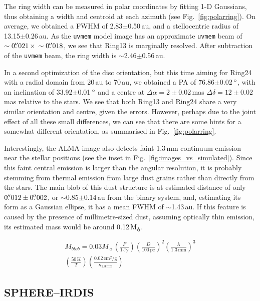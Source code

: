 \documentclass[fleqn,usenatbib,useAMS]{mnras}
\begin{document}
The ring width can be measured in polar coordinates by fitting 1-D Gaussians, thus obtaining a width and centroid at each azimuth (see Fig.~\ref{fig:polarring}). On average, we obtained a FWHM of 2.83$\pm$0.50\,au, and a stellocentric radius of 13.15$\pm$0.26\,au. As the {\tt uvmem} model image has an approximate {\tt uvmem} beam of $\sim0\hbox{$.\!\!^{\prime\prime}$}021 \,\times \,\sim0\hbox{$.\!\!^{\prime\prime}$}018$, we see that Ring13 is marginally resolved. After subtraction of the {\tt uvmem} beam, the ring width is $\sim$2.46$\pm$0.56\,au.

In a second optimization of the disc orientation, but this time aiming for Ring24 with a radial domain from 20\,au to 70\,au, we obtained a PA of 76.86$\pm$0.02\,$\hbox{$^\circ$}$, with an inclination of 33.92$\pm$0.01\,$\hbox{$^\circ$}$ and a centre at $\Delta \alpha = 2\pm0.02$\,mas $\Delta \delta = 12\pm0.02$\,mas relative to the stars. We see that both Ring13 and Ring24 share a very similar orientation and centre, given the errors. However, perhaps due to the joint effect of all these small differences, we can see that there are some hints for a somewhat different orientation, as summarised in Fig.~\ref{fig:polarring}.

Interestingly, the ALMA image also detects faint 1.3\,mm continuum emission near the stellar positions (see the inset in Fig.~\ref{fig:images_vs_simulated}). Since this faint central emission is larger than the angular resolution, it is probably stemming from thermal emission from  large dust grains rather than directly from the stars. The main blob of this dust structure is at estimated distance of only $0\hbox{$.\!\!^{\prime\prime}$}012\pm0\hbox{$.\!\!^{\prime\prime}$}002$, or $\sim$0.85$\pm$0.14\,au from the binary system, and, estimating its form as a Gaussian ellipse, it has a mean FWHM of $\sim$1.43\,au. If this feature is caused by the presence of millimetre-sized dust, assuming optically thin emission, its estimated mass would be around 0.12\,M$_{\earth}$.

\begin{multline}
      M_{blob} = 0.03 M_{\sun} \left(\frac{F}{1\,\mathrm{Jy}}\right) \left(\frac{D}{100\,\mathrm{pc}}\right)^2 \left(\frac{\lambda}{1.3\,\mathrm{mm}}\right)^3 
      \\
      \left(\frac{50\,\mathrm{K}}{T}\right)    \left(\frac{0.02\,\mathrm{cm^2/g}}{\kappa_{1.3\,\mathrm{mm}}}\right)
\end{multline}

\subsection{SPHERE--IRDIS}
\end{document}
